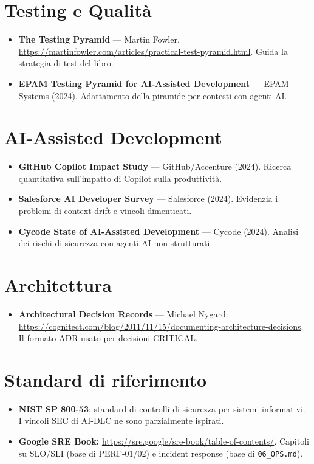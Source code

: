 \section*{Testing e Qualità}

\begin{itemize}
  \item \textbf{The Testing Pyramid} --- Martin Fowler, \url{https://martinfowler.com/articles/practical-test-pyramid.html}. Guida la strategia di test del libro.
  \item \textbf{EPAM Testing Pyramid for AI-Assisted Development} --- EPAM Systems (2024). Adattamento della piramide per contesti con agenti AI.
\end{itemize}

\section*{AI-Assisted Development}

\begin{itemize}
  \item \textbf{GitHub Copilot Impact Study} --- GitHub/Accenture (2024). Ricerca quantitativa sull'impatto di Copilot sulla produttività.
  \item \textbf{Salesforce AI Developer Survey} --- Salesforce (2024). Evidenzia i problemi di context drift e vincoli dimenticati.
  \item \textbf{Cycode State of AI-Assisted Development} --- Cycode (2024). Analisi dei rischi di sicurezza con agenti AI non strutturati.
\end{itemize}

\section*{Architettura}

\begin{itemize}
  \item \textbf{Architectural Decision Records} --- Michael Nygard: \url{https://cognitect.com/blog/2011/11/15/documenting-architecture-decisions}. Il formato ADR usato per decisioni CRITICAL.
\end{itemize}

\section*{Standard di riferimento}

\begin{itemize}
  \item \textbf{NIST SP 800-53}: standard di controlli di sicurezza per sistemi informativi. I vincoli SEC di AI-DLC ne sono parzialmente ispirati.
  \item \textbf{Google SRE Book:} \url{https://sre.google/sre-book/table-of-contents/}. Capitoli su SLO/SLI (base di PERF-01/02) e incident response (base di \texttt{06\_OPS.md}).
\end{itemize}

